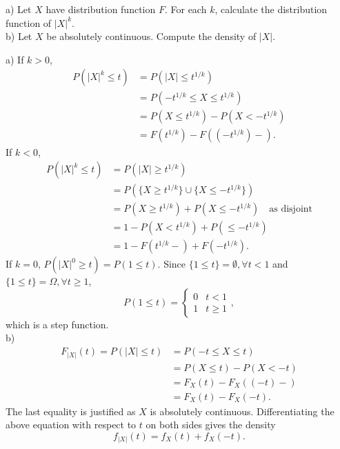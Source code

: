 \begin{exercise}
  a) Let $X$ have distribution function $F$. For each $k$, calculate the distribution function of $|X|^k$. \\
  b) Let $X$ be absolutely continuous. Compute the density of $|X|$.
\end{exercise}
\begin{solution}
  a) If $k>0$,
  \begin{align*}
    P(|X|^k\leq t) &= P(|X|\leq t^{1/k}) \\
      &= P(-t^{1/k}\leq X\leq t^{1/k}) \\
      &= P(X\leq t^{1/k}) - P(X<-t^{1/k}) \\
      &= F(t^{1/k}) - F((-t^{1/k})-) .
  \end{align*}
  If $k<0$,
  \begin{align*}
    P(|X|^k\leq t) &= P(|X|\geq t^{1/k}) \\
      &= P(\{X\geq t^{1/k}\}\cup\{X\leq -t^{1/k}\}) \\
      &= P(X\geq t^{1/k}) + P(X\leq -t^{1/k}) \quad \mbox{as disjoint} \\
      &= 1 - P(X<t^{1/k}) + P(\leq -t^{1/k}) \\
      &= 1 - F(t^{1/k}-) + F(-t^{1/k}) .
  \end{align*}
  If $k=0$, $P(|X|^0\geq t) = P(1\leq t)$. Since $\{1\leq t\}=\emptyset, \forall t<1$ and $\{1\leq t\}=\Omega, \forall t\geq 1$,
  \[
    P(1\leq t) = \begin{cases}
      0 & t < 1 \\
      1 & t \geq 1
    \end{cases},
  \]
  which is a step function. \\

  b) \begin{align*}
    F_{|X|}(t) = P(|X|\leq t) &= P(-t\leq X\leq t) \\
      &= P(X\leq t) - P(X<-t) \\
      &= F_X(t) - F_X((-t)-) \\
      &= F_X(t) - F_X(-t) .
  \end{align*}
  The last equality is justified as $X$ is absolutely continuous. Differentiating the above equation with respect to $t$ on both sides gives the density
  \[ f_{|X|}(t) = f_X(t) + f_X(-t) .\]
\end{solution}


